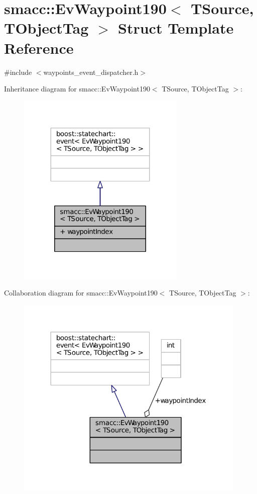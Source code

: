 \hypertarget{structsmacc_1_1EvWaypoint190}{}\section{smacc\+:\+:Ev\+Waypoint190$<$ T\+Source, T\+Object\+Tag $>$ Struct Template Reference}
\label{structsmacc_1_1EvWaypoint190}


{\ttfamily \#include $<$waypoints\+\_\+event\+\_\+dispatcher.\+h$>$}



Inheritance diagram for smacc\+:\+:Ev\+Waypoint190$<$ T\+Source, T\+Object\+Tag $>$\+:
\nopagebreak
\begin{figure}[H]
\begin{center}
\leavevmode
\includegraphics[width=227pt]{structsmacc_1_1EvWaypoint190__inherit__graph}
\end{center}
\end{figure}


Collaboration diagram for smacc\+:\+:Ev\+Waypoint190$<$ T\+Source, T\+Object\+Tag $>$\+:
\nopagebreak
\begin{figure}[H]
\begin{center}
\leavevmode
\includegraphics[width=312pt]{structsmacc_1_1EvWaypoint190__coll__graph}
\end{center}
\end{figure}

